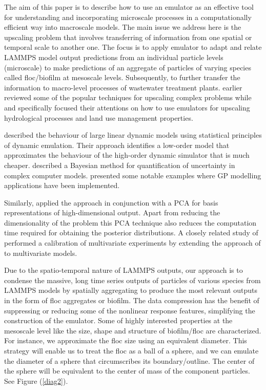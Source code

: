 The aim of this paper is to describe how to use an emulator as an effective tool for understanding and incorporating microscale processes in a computationally efficient way into macroscale models. The main issue we address here is the upscaling problem that involves transferring of information from one spatial or temporal scale to another one. The focus is to apply emulator to adapt and relate LAMMPS model output predictions from an individual particle levels (microscale) to make predictions of an aggregate of particles of varying species called floc/biofilm at mesoscale levels. Subsequently, to further transfer the information to macro-level processes of wastewater treatment plants. \citet{l9} earlier reviewed some of the popular techniques for upscaling complex problems while \citet{l4} and \citet{l8} specifically focused their attentions on how to use emulators for upscaling hydrological processes and land use management properties.

\cite{83} described the behaviour of large linear dynamic models using statistical principles of dynamic emulation. Their approach identifies a low-order model that approximates the behaviour of the high-order dynamic simulator that is much cheaper. \cite{q5} described a Bayesian method for quantification of uncertainty in complex computer models. \cite{q17} presented some notable examples where GP modelling applications have been implemented. %

Similarly, \cite{q23} applied the \cite{60} approach in conjunction with a PCA for basis representations of high-dimensional output. Apart from reducing the dimensionality of the problem this PCA technique also reduces the computation time required for obtaining the posterior distributions. A closely related study of \cite{80} performed a calibration of multivariate experiments by extending the approach of \cite{45} to multivariate models. %
 
Due to the spatio-temporal nature of LAMMPS outputs, our approach is to condense the massive, long time series outputs of particles of various species from LAMMPS models by spatially aggregating to produce the most relevant outputs in the form of floc aggregates or biofilm. The data compression has the benefit of suppressing or reducing some of the nonlinear response features, simplifying the construction of the emulator. Some of highly interested properties at the mesoscale level like the size, shape and structure of biofilm/floc are characterized. For instance, we approximate the floc size using an equivalent diameter. This strategy will enable us to treat the floc as a ball of a sphere, and we can emulate the diameter of a sphere that circumscribes its boundary/outline. The center of the sphere will be equivalent to the center of mass of the component particles. See Figure (\ref{diag2}).

